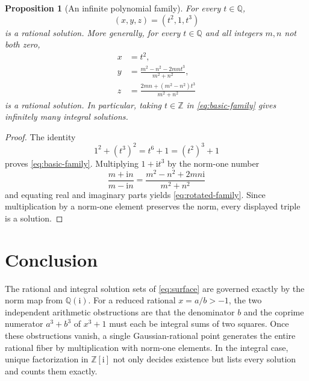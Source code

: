 \documentclass[11pt,a4paper]{article}
\numberwithin{equation}{section}
\newtheorem{proposition}[theorem]{Proposition}
\theoremstyle{definition}
\newcommand{\Q}{\mathbb{Q}}
\newcommand{\Z}{\mathbb{Z}}
\newcommand{\ii}{\mathrm{i}}
\begin{document}
\begin{proposition}[An infinite polynomial family]
\label{prop:infinite-family}
For every $t\in\Q$,
\begin{equation}
 (x,y,z)=(t^2,1,t^3)
 \label{eq:basic-family}
\end{equation}
is a rational solution. More generally, for every $t\in\Q$ and all integers $m,n$ not both zero,
\begin{equation}
 \boxed{
 \begin{aligned}
 x&=t^2,\\
 y&=\frac{m^2-n^2-2mnt^3}{m^2+n^2},\\
 z&=\frac{2mn+(m^2-n^2)t^3}{m^2+n^2}
 \end{aligned}}
 \label{eq:rotated-family}
\end{equation}
is a rational solution. In particular, taking $t\in\Z$ in \eqref{eq:basic-family} gives infinitely many integral solutions.
\end{proposition}

\begin{proof}
The identity
\[
 1^2+(t^3)^2=t^6+1=(t^2)^3+1
\]
proves \eqref{eq:basic-family}. Multiplying $1+\ii t^3$ by the norm-one number
\[
 \frac{m+\ii n}{m-\ii n}
 =\frac{m^2-n^2+2mn\ii}{m^2+n^2}
\]
and equating real and imaginary parts yields \eqref{eq:rotated-family}. Since multiplication by a norm-one element preserves the norm, every displayed triple is a solution.
\end{proof}

\section{Conclusion}

The rational and integral solution sets of \eqref{eq:surface} are governed exactly by the norm map from $\Q(\ii)$. For a reduced rational $x=a/b>-1$, the two independent arithmetic obstructions are that the denominator $b$ and the coprime numerator $a^3+b^3$ of $x^3+1$ must each be integral sums of two squares. Once these obstructions vanish, a single Gaussian-rational point generates the entire rational fiber by multiplication with norm-one elements. In the integral case, unique factorization in $\Z[\ii]$ not only decides existence but lists every solution and counts them exactly.
\end{document}
